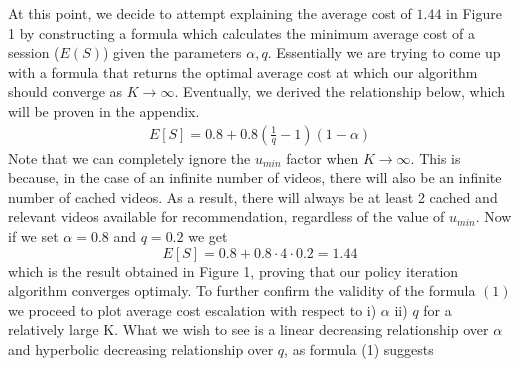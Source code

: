 \documentclass[12pt]{article}
\begin{document}
   At this point, we decide to attempt explaining the average cost of $1.44$ in Figure 1 by constructing a formula which calculates the minimum average cost of a session ($E(S)$) given the parameters $\alpha,q$.
Essentially we are trying to come up with a formula that returns the optimal average cost at which our algorithm should converge as $K \rightarrow \infty$.
Eventually, we derived the relationship below, which will be proven in the appendix.
\begin{align*}
    E[S] = 0.8 + 0.8(\frac{1}{q}-1)(1-\alpha)  \tag{1}
\end{align*}
Note that we can completely ignore the $u_{min}$ factor when $K\rightarrow \infty$. This is because, in the case of an infinite number of videos, there will also be an infinite number of cached videos. As a result,
 there will always be at least 2 cached and relevant videos available for recommendation, regardless of the value of $u_{min}$.
    Now if we set $\alpha =0.8$ and $q=0.2$ we get 
    $$E[S] = 0.8 + 0.8\cdot 4\cdot 0.2=1.44$$
    which is the result obtained in Figure 1, proving that our policy iteration algorithm converges optimaly.
    To further confirm the validity of the formula $(1)$ we proceed to plot average cost escalation with respect to i) $\alpha$ ii) $q$ for a relatively large K.
    What we wish to see is a linear decreasing relationship over $\alpha$ and hyperbolic decreasing relationship over $q$, as formula (1) suggests
\end{document}
